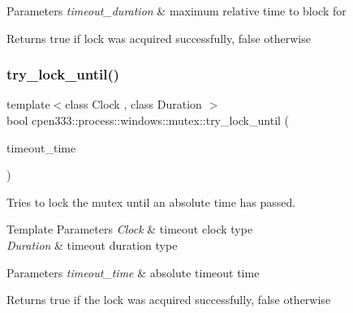 \begin{DoxyParams}{Parameters}
{\em timeout\+\_\+duration} & maximum relative time to block for \\
\hline
\end{DoxyParams}
\begin{DoxyReturn}{Returns}
true if lock was acquired successfully, false otherwise 
\end{DoxyReturn}
\mbox{\label{classcpen333_1_1process_1_1windows_1_1mutex_a87d22d9dce4211d0e077cbf7db462fdf}} 
\subsubsection{\texorpdfstring{try\+\_\+lock\+\_\+until()}{try\_lock\_until()}}
{\footnotesize\ttfamily template$<$class Clock , class Duration $>$ \\
bool cpen333\+::process\+::windows\+::mutex\+::try\+\_\+lock\+\_\+until (\begin{DoxyParamCaption}\item[{const std\+::chrono\+::time\+\_\+point$<$ Clock, Duration $>$ \&}]{timeout\+\_\+time }\end{DoxyParamCaption})\hspace{0.3cm}{\ttfamily [inline]}}



Tries to lock the mutex until an absolute time has passed. 


\begin{DoxyTemplParams}{Template Parameters}
{\em Clock} & timeout clock type \\
\hline
{\em Duration} & timeout duration type \\
\hline
\end{DoxyTemplParams}

\begin{DoxyParams}{Parameters}
{\em timeout\+\_\+time} & absolute timeout time \\
\hline
\end{DoxyParams}
\begin{DoxyReturn}{Returns}
true if the lock was acquired successfully, false otherwise 
\end{DoxyReturn}
\mbox{\label{classcpen333_1_1process_1_1windows_1_1mutex_aa45381a0a226fbefc86eef8971a5431b}} 

